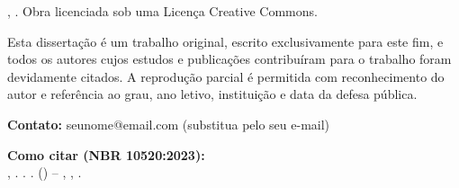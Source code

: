 \begingroup 
\makeatletter

\begin{center}
  \begin{minipage}{0.9\textwidth}
    \normalsize 
    \setlength{\parindent}{0pt} 
    
    \scalebox{1.65}{\ccbyncnd}
    
    \vspace{1em}
    
    \@autor, \@UNIDADEENSINO{}.
    \noindent Obra licenciada sob uma Licença Creative Commons. \@ano
    
    \vspace{1em}
    
    Esta dissertação é um trabalho original, escrito exclusivamente para este fim, e todos os autores cujos estudos e publicações contribuíram para o trabalho foram devidamente citados. A reprodução parcial é permitida com reconhecimento do autor e referência ao grau, ano letivo, instituição e data da defesa pública.
    
    \vspace{1em}
    
    \textbf{Contato:} seunome@email.com (substitua pelo seu e-mail)
    
    \vspace{1em}
    
    \textbf{Como citar (NBR 10520:2023):}\\
    \MakeUppercase{\@autorsobrenome}, \@autorprenome. \textit{\@titulo}. \@ano. \@monopt{} (\@degnamept) -- \@UNIFEI, \@CIDADE, \@ano.
    
  \end{minipage}
\end{center}

\vfill 

